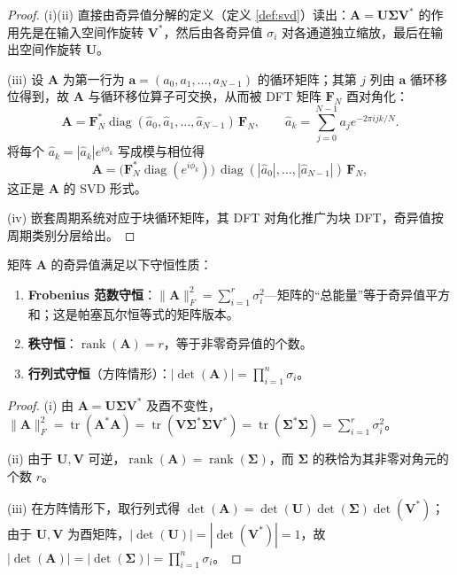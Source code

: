 \begin{proof}
(i)(ii) 直接由奇异值分解的定义（定义 \ref{def:svd}）读出：$\mathbf{A} = \mathbf{U}\boldsymbol{\Sigma}\mathbf{V}^*$ 的作用先是在输入空间作旋转 $\mathbf{V}^*$，然后由各奇异值 $\sigma_i$ 对各通道独立缩放，最后在输出空间作旋转 $\mathbf{U}$。

(iii) 设 $\mathbf{A}$ 为第一行为 $\mathbf{a} = (a_0, a_1, \dots, a_{N-1})$ 的循环矩阵；其第 $j$ 列由 $\mathbf{a}$ 循环移位得到，故 $\mathbf{A}$ 与循环移位算子可交换，从而被 DFT 矩阵 $\mathbf{F}_N$ 酉对角化：
\[
\mathbf{A} = \mathbf{F}_N^* \operatorname{diag}(\hat{a}_0, \hat{a}_1, \dots, \hat{a}_{N-1})\, \mathbf{F}_N, \qquad \hat{a}_k = \sum_{j=0}^{N-1} a_j e^{-2\pi i jk/N}.
\]
将每个 $\hat{a}_k = |\hat{a}_k| e^{i\phi_k}$ 写成模与相位得
\[
\mathbf{A} = \bigl(\mathbf{F}_N^* \operatorname{diag}(e^{i\phi_k})\bigr)\, \operatorname{diag}(|\hat{a}_0|, \dots, |\hat{a}_{N-1}|)\, \mathbf{F}_N,
\]
这正是 $\mathbf{A}$ 的 SVD 形式。

(iv) 嵌套周期系统对应于块循环矩阵，其 DFT 对角化推广为块 DFT，奇异值按周期类别分层给出。
\end{proof}

\begin{proposition}[奇异值与守恒量]\label{prop:svd_conservation}
矩阵 $\mathbf{A}$ 的奇异值满足以下守恒性质：
\begin{enumerate}[label=(\roman*)]
    \item \textbf{Frobenius 范数守恒}：$\|\mathbf{A}\|_F^2 = \sum_{i=1}^r \sigma_i^2$---矩阵的“总能量”等于奇异值平方和；这是帕塞瓦尔恒等式的矩阵版本。
    \item \textbf{秩守恒}：$\operatorname{rank}(\mathbf{A}) = r$，等于非零奇异值的个数。
    \item \textbf{行列式守恒}（方阵情形）：$|\det(\mathbf{A})| = \prod_{i=1}^n \sigma_i$。
\end{enumerate}
\end{proposition}

\begin{proof}
(i) 由 $\mathbf{A} = \mathbf{U}\boldsymbol{\Sigma}\mathbf{V}^*$ 及酉不变性，$\|\mathbf{A}\|_F^2 = \operatorname{tr}(\mathbf{A}^*\mathbf{A}) = \operatorname{tr}(\mathbf{V}\boldsymbol{\Sigma}^*\boldsymbol{\Sigma}\mathbf{V}^*) = \operatorname{tr}(\boldsymbol{\Sigma}^*\boldsymbol{\Sigma}) = \sum_{i=1}^r \sigma_i^2$。

(ii) 由于 $\mathbf{U}, \mathbf{V}$ 可逆，$\operatorname{rank}(\mathbf{A}) = \operatorname{rank}(\boldsymbol{\Sigma})$，而 $\boldsymbol{\Sigma}$ 的秩恰为其非零对角元的个数 $r$。

(iii) 在方阵情形下，取行列式得 $\det(\mathbf{A}) = \det(\mathbf{U})\det(\boldsymbol{\Sigma})\det(\mathbf{V}^*)$；由于 $\mathbf{U}, \mathbf{V}$ 为酉矩阵，$|\det(\mathbf{U})| = |\det(\mathbf{V}^*)| = 1$，故 $|\det(\mathbf{A})| = |\det(\boldsymbol{\Sigma})| = \prod_{i=1}^n \sigma_i$。
\end{proof}

